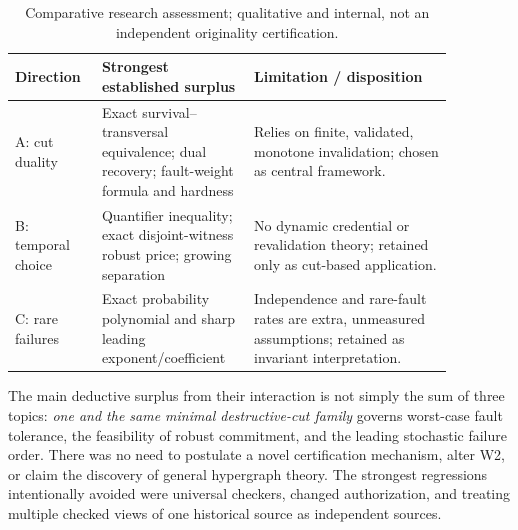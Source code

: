 \documentclass[11pt,letterpaper]{article}
\begin{document}
\begin{table}[ht]
\centering\small
\caption{Comparative research assessment; qualitative and internal, not an independent originality certification.}
\label{tab:directions}
\begin{tabular}{@{}>{\raggedright\arraybackslash}p{0.15\linewidth}>{\raggedright\arraybackslash}p{0.31\linewidth}>{\raggedright\arraybackslash}p{0.41\linewidth}@{}}
\toprule
Direction & Strongest established surplus & Limitation / disposition\\ \midrule
A: cut duality & Exact survival--transversal equivalence; dual recovery; fault-weight formula and hardness & Relies on finite, validated, monotone invalidation; chosen as central framework.\\
B: temporal choice & Quantifier inequality; exact disjoint-witness robust price; growing separation & No dynamic credential or revalidation theory; retained only as cut-based application.\\
C: rare failures & Exact probability polynomial and sharp leading exponent/coefficient & Independence and rare-fault rates are extra, unmeasured assumptions; retained as invariant interpretation.\\
\bottomrule
\end{tabular}
\end{table}

The main deductive surplus from their interaction is not simply the sum of three topics: \emph{one and the same minimal destructive-cut family} governs worst-case fault tolerance, the feasibility of robust commitment, and the leading stochastic failure order. There was no need to postulate a novel certification mechanism, alter W2, or claim the discovery of general hypergraph theory. The strongest regressions intentionally avoided were universal checkers, changed authorization, and treating multiple checked views of one historical source as independent sources.
\end{document}
